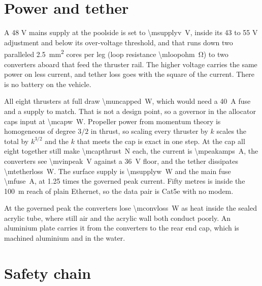 \documentclass[10pt,a4paper]{article}
\begin{document}
\section{Power and tether}\label{sec:power}

A 48 V mains supply at the poolside is set to \SI{\msupplyv}{\volt}, inside
its 43 to 55 V adjustment and below its over-voltage threshold, and that runs
down two paralleled \SI{2.5}{\milli\metre\squared} cores per leg (loop
resistance \SI{\mloopohm}{\ohm}) to two converters aboard that feed the
thruster rail. The higher voltage carries the same power on less current, and
tether loss goes with the square of the current. There is no battery on the
vehicle.

All eight thrusters at full draw \SI{\muncapped}{\watt}, which would need a
\SI{40}{\ampere} fuse and a supply to match. That is not a design point, so a
governor in the allocator caps input at \SI{\mcapw}{\watt}. Propeller power
from momentum theory is homogeneous of degree $3/2$ in thrust, so scaling
every thruster by $k$ scales the total by $k^{3/2}$ and the $k$ that meets the
cap is exact in one step. At the cap all eight together still make
\SI{\mcapthrust}{\newton} each, the current is \SI{\mpeakamps}{\ampere}, the
converters see \SI{\mvinpeak}{\volt} against a \SI{36}{\volt} floor, and the
tether dissipates \SI{\mtetherloss}{\watt}. The surface supply is
\SI{\msupplyw}{\watt} and the main fuse \SI{\mfuse}{\ampere}, at 1.25 times
the governed peak current. Fifty metres is inside the \SI{100}{\metre} reach
of plain Ethernet, so the data pair is Cat5e with no modem.

At the governed peak the converters lose \SI{\mconvloss}{\watt} as heat inside
the sealed acrylic tube, where still air and the acrylic wall both conduct
poorly. An aluminium plate carries it from the converters to the rear end
cap, which is machined aluminium and in the water.

\section{Safety chain}\label{sec:safety}
\end{document}
